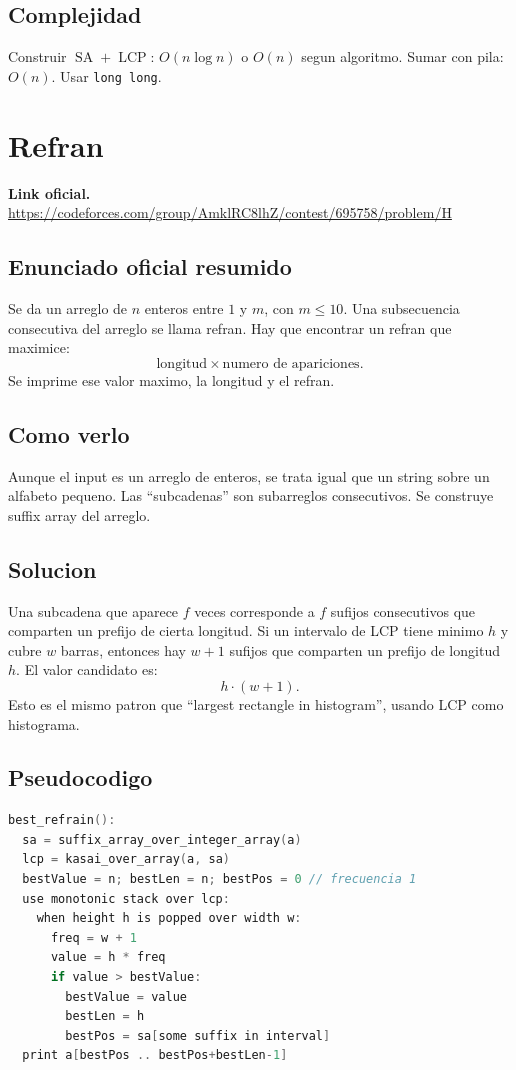 \documentclass[10pt]{article}
\newcommand{\bigO}{O}
\newcommand{\SA}{\operatorname{SA}}
\newcommand{\LCP}{\operatorname{LCP}}
\begin{document}
\subsection{Complejidad}
Construir $\SA+\LCP$: $\bigO(n\log n)$ o $\bigO(n)$ segun algoritmo. Sumar con
pila: $\bigO(n)$. Usar \texttt{long long}.

\newpage

\section{Refran}
\textbf{Link oficial.} \url{https://codeforces.com/group/AmklRC8lhZ/contest/695758/problem/H}

\subsection{Enunciado oficial resumido}
Se da un arreglo de $n$ enteros entre $1$ y $m$, con $m\le 10$. Una subsecuencia
consecutiva del arreglo se llama refran. Hay que encontrar un refran que
maximice:
\[
\text{longitud}\times\text{numero de apariciones}.
\]
Se imprime ese valor maximo, la longitud y el refran.

\subsection{Como verlo}
Aunque el input es un arreglo de enteros, se trata igual que un string sobre un
alfabeto pequeno. Las ``subcadenas'' son subarreglos consecutivos. Se construye
suffix array del arreglo.

\subsection{Solucion}
Una subcadena que aparece $f$ veces corresponde a $f$ sufijos consecutivos que
comparten un prefijo de cierta longitud. Si un intervalo de LCP tiene minimo
$h$ y cubre $w$ barras, entonces hay $w+1$ sufijos que comparten un prefijo de
longitud $h$. El valor candidato es:
\[
h\cdot (w+1).
\]
Esto es el mismo patron que ``largest rectangle in histogram'', usando LCP como
histograma.

\subsection{Pseudocodigo}
\begin{lstlisting}[language=C++]
best_refrain():
  sa = suffix_array_over_integer_array(a)
  lcp = kasai_over_array(a, sa)
  bestValue = n; bestLen = n; bestPos = 0 // frecuencia 1
  use monotonic stack over lcp:
    when height h is popped over width w:
      freq = w + 1
      value = h * freq
      if value > bestValue:
        bestValue = value
        bestLen = h
        bestPos = sa[some suffix in interval]
  print a[bestPos .. bestPos+bestLen-1]
\end{lstlisting}
\end{document}
